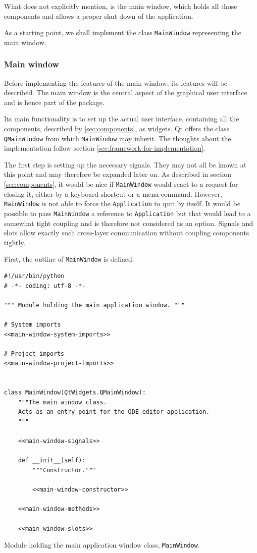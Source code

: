 \documentclass[10pt, openright, notitlepage]{scrreprt}
\newcommand{\myverb}{\collectverb{\fcolorbox{black!50}{black!25}}}
\begin{document}
What \cite{osterwalder_qde_2016} does not explicitly mention, is the main
window, which holds all those components and allows a proper shut down of the
application.

As a starting point, we shall implement the class \texttt{MainWindow} representing the
main window.

\subsubsection{Main window}
\label{sec:org7a1c3bc}

Before implementing the features of the main window, its features will be
described. The main window is the central aspect of the graphical user interface
and is hence part of the \myverb{gui} package.

Its main functionality is to set up the actual user interface, containing all
the components, described by \ref{sec:components}, as widgets. Qt offers the class
\texttt{QMainWindow} from which \texttt{MainWindow} may inherit. The thoughts about the
implementation follow section \ref{sec:framework-for-implementation}.

The first step is setting up the necessary signals. They may not all be known at
this point and may therefore be expanded later on. As described in section
\ref{sec:components}, it would be nice if \texttt{MainWindow} would react to a request for
closing it, either by a keyboard shortcut or a menu command. However,
\texttt{MainWindow} is not able to force the \texttt{Application} to quit by itself. It would
be possible to pass \texttt{MainWindow} a reference to \texttt{Application} but that would
lead to a somewhat tight coupling and is therefore not considered as an option.
Signals and slots allow exactly such cross-layer communication without coupling
components tightly.

First, the outline of \texttt{MainWindow} is defined.

\begin{listing}[H]
\begin{verbatim}
#!/usr/bin/python
# -*- coding: utf-8 -*-

""" Module holding the main application window. """

# System imports
<<main-window-system-imports>>

# Project imports
<<main-window-project-imports>>


class MainWindow(QtWidgets.QMainWindow):
    """The main window class.
    Acts as an entry point for the QDE editor application.
    """

    <<main-window-signals>>

    def __init__(self):
        """Constructor."""

        <<main-window-constructor>>

    <<main-window-methods>>

    <<main-window-slots>>
\end{verbatim}
\caption{Module holding the main application window class, \texttt{MainWindow}.}
\end{listing}
\end{document}
